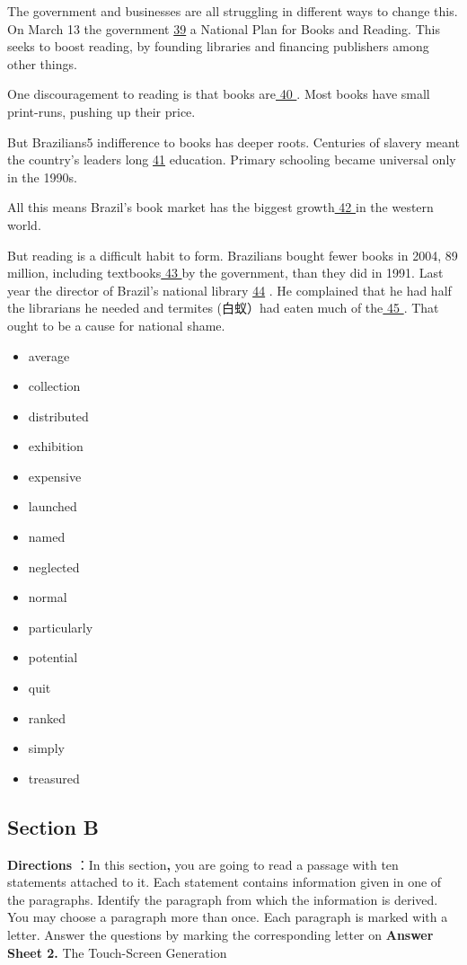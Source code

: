 \documentclass[UTF8,11pt]{ctexart}
\begin{document}
The government and businesses are all struggling in different ways to change this. On March 13 the government \uline{39} a National Plan for Books and Reading. This seeks to boost reading, by founding libraries and financing publishers among other things.


One discouragement to reading is that books are\uline{ 40 }. Most books have small print-runs, pushing up their price.


But Brazilians5 indifference to books has deeper roots. Centuries of slavery meant the country’s leaders long \uline{41} education. Primary schooling became universal only in the 1990s.


All this means Brazil’s book market has the biggest growth\uline{ 42 }in the western world.


But reading is a difficult habit to form. Brazilians bought fewer books in 2004, 89 million, including textbooks\uline{ 43 }by the government, than they did in 1991. Last year the director of Brazil’s national library \uline{44} . He complained that he had half the librarians he needed and termites (白蚁）had eaten much of the\uline{ 45 }. That ought to be a cause for national shame.


\begin{itemize}[leftmargin=2em,itemsep=.2em,topsep=.4em]\item[A.] average
\item[B.] collection
\item[C.] distributed
\item[D.] exhibition
\item[E.] expensive
\item[F.] launched
\item[G.] named
\item[H.] neglected
\item[I.] normal
\item[J.] particularly
\item[K.] potential
\item[L.] quit
\item[M.] ranked
\item[N.] simply
\item[O.] treasured
\end{itemize}

\subsection*{Section B}


\textbf{Directions} ：In this section\textbf{,} you are going to read a passage with ten statements attached to it. Each statement contains information given in one of the paragraphs. Identify the paragraph from which the information is derived. You may choose a paragraph more than once. Each paragraph is marked with a letter. Answer the questions by marking the corresponding letter on\textbf{ Answer Sheet 2.} The Touch-Screen Generation
\end{document}
